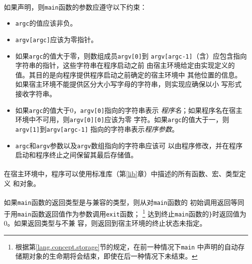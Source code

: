 \paragraph{}
如果声明，则\texttt{main}函数的参数应遵守以下约束：
\begin{itemize}
  \item{\texttt{argc}的值应该非负。}
  \item{\texttt{argv[argc]}应该为零指针。}
  \item{如果\texttt{argc}的值大于零，则数组成员\texttt{argv[0]}到
    \texttt{argv[argc-1]}（含）应包含指向字符串的指针，这些字符串在程序启动之前
    由宿主环境给定由实现定义的值。其目的是向程序提供程序启动之前确定的宿主环境中
    其他位置的信息。如果宿主环境不能提供区分大小写字母的字符串，则实现应确保以小
    写形式接收字符串。}
  \item{如果\texttt{argc}的值大于$0$，\texttt{argv[0]}指向的字符串表示
    \textit{程序名}；如果程序名在宿主环境中不可用，则\texttt{argv[0][0]}应该为零
    字符。如果\texttt{argc}的值大于一，则\texttt{argv[1]}到\texttt{argv[argc-1]}
    指向的字符串表示\textit{程序参数}。}
  \item{\texttt{argc}和\texttt{argv}参数以及\texttt{argv}数组指向的字符串应该可
    以由程序修改，并在程序启动和程序终止之间保留其最后存储值。}
\end{itemize}

\paragraph{}
在宿主环境中，程序可以使用标准库（第\ref{lib}章）中描述的所有函数、宏、类型定义
和对象。

\paragraph{}
如果\texttt{main}函数的返回类型是与兼容的类型，则从对\texttt{main}函数的
初始调用返回等同于用\texttt{main}函数返回值作为参数调用\texttt{exit}函数；
\footnote{根据第\ref{lang.concept.storage}节的规定，在前一种情况下\texttt{main}
中声明的自动存储期对象的生命期将会结束，即使在后一种情况下未结束。}
达到终止\texttt{main}函数的\texttt{\}}时返回值为$0$。如果返回类型与不兼
容，则返回到宿主环境的终止状态未指定。


